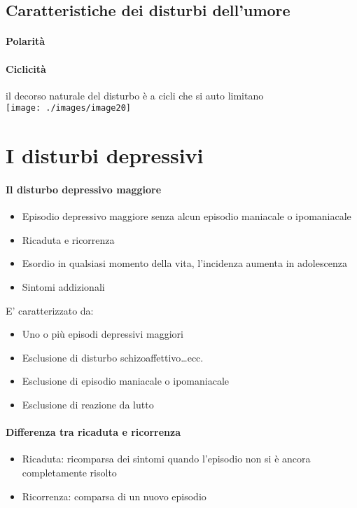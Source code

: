 \subsection{Caratteristiche dei disturbi dell'umore}
\paragraph{Polarità}  
\paragraph{Ciclicità} il decorso naturale del disturbo è a cicli che si auto limitano
\medskip\\
\texttt{[image: ./images/image20]}
\medskip\\
\section{I disturbi depressivi}
\paragraph{Il disturbo depressivo maggiore}  
\begin{itemize}
	\item Episodio depressivo maggiore senza alcun episodio maniacale o ipomaniacale
	\item Ricaduta e ricorrenza
	\item Esordio in qualsiasi momento della vita, l'incidenza aumenta in adolescenza
	\item Sintomi addizionali
\end{itemize}
E' caratterizzato da:
\begin{itemize}
	\item Uno o più episodi depressivi maggiori
	\item Esclusione di disturbo schizoaffettivo\ldots ecc.
	\item Esclusione di episodio maniacale o ipomaniacale
	\item Esclusione di reazione da lutto
\end{itemize}
\paragraph{Differenza tra ricaduta e ricorrenza}  
\begin{itemize}
	\item Ricaduta: ricomparsa dei sintomi quando l'episodio non si è ancora completamente risolto
	\item Ricorrenza: comparsa di un nuovo episodio
\end{itemize}
